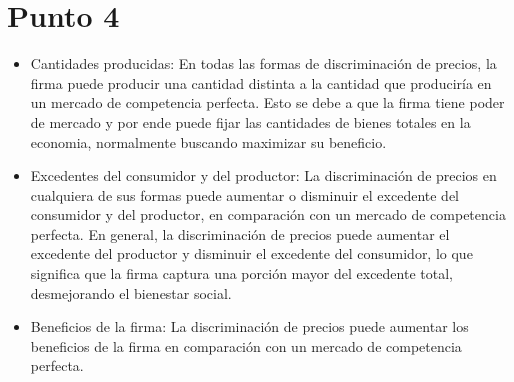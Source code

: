 \documentclass[11pt]{article}
\begin{document}
\section{Punto 4}
\begin{flushleft}
    \begin{itemize}
        \item Cantidades producidas: En todas las formas de discriminación de precios, la firma puede producir una cantidad distinta a la cantidad que produciría en un mercado de competencia perfecta.
        Esto se debe a que la firma tiene poder de mercado y por ende puede fijar las cantidades de bienes totales en la economia, normalmente buscando maximizar su beneficio.

        \item Excedentes del consumidor y del productor: La discriminación de precios en cualquiera de sus formas puede aumentar o disminuir el excedente del consumidor y del productor, en comparación con un mercado de competencia perfecta. En general, la discriminación de precios puede aumentar el excedente del productor y disminuir el excedente del consumidor, lo que significa que la firma captura una porción mayor del excedente total, desmejorando el bienestar social.
        
        \item Beneficios de la firma: La discriminación de precios puede aumentar los beneficios de la firma en comparación con un mercado de competencia perfecta.
        
    \end{itemize}
\end{flushleft}
\end{document}
